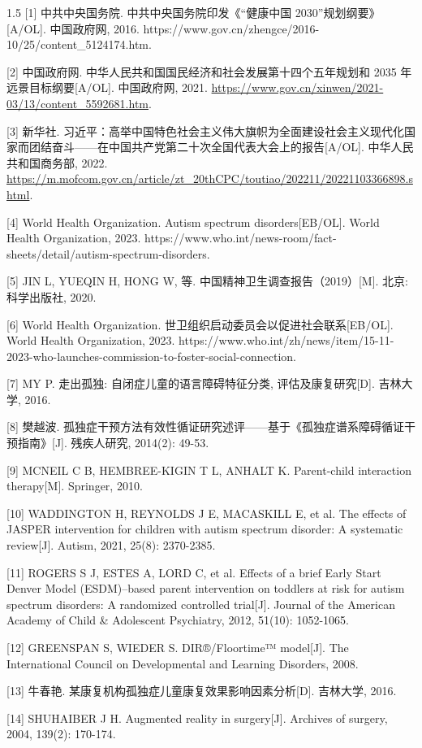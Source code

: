 \documentclass[zihao=-4]{ctexart}
\begin{document}
\begin{spacing}{1.5}
[1] 中共中央国务院. 中共中央国务院印发《“健康中国 2030”规划纲要》[A/OL]. 中国政府网, 2016. https://www.gov.cn/zhengce/2016-10/25/content\_5124174.htm.

[2] 中国政府网. 中华人民共和国国民经济和社会发展第十四个五年规划和 2035 年远景目标纲要[A/OL]. 中国政府网, 2021. \url{https://www.gov.cn/xinwen/2021-03/13/content_5592681.htm}.

[3] 新华社. 习近平：高举中国特色社会主义伟大旗帜为全面建设社会主义现代化国家而团结奋斗——在中国共产党第二十次全国代表大会上的报告[A/OL]. 中华人民共和国商务部, 2022. \url{https://m.mofcom.gov.cn/article/zt_20thCPC/toutiao/202211/20221103366898.shtml}.

[4] World Health Organization. Autism spectrum disorders[EB/OL]. World Health Organization, 2023. https://www.who.int/news-room/fact-sheets/detail/autism-spectrum-disorders.

[5] JIN L, YUEQIN H, HONG W, 等. 中国精神卫生调查报告（2019）[M]. 北京: 科学出版社, 2020.

[6] World Health Organization. 世卫组织启动委员会以促进社会联系[EB/OL]. World Health Organization, 2023. https://www.who.int/zh/news/item/15-11-2023-who-launches-commission-to-foster-social-connection.

[7] MY P. 走出孤独: 自闭症儿童的语言障碍特征分类, 评估及康复研究[D]. 吉林大学, 2016.

[8] 樊越波. 孤独症干预方法有效性循证研究述评——基于《孤独症谱系障碍循证干预指南》[J]. 残疾人研究, 2014(2): 49-53.

[9] MCNEIL C B, HEMBREE-KIGIN T L, ANHALT K. Parent-child interaction therapy[M]. Springer, 2010.

[10] WADDINGTON H, REYNOLDS J E, MACASKILL E, et al. The effects of JASPER intervention for children with autism spectrum disorder: A systematic review[J]. Autism, 2021, 25(8): 2370-2385.

[11] ROGERS S J, ESTES A, LORD C, et al. Effects of a brief Early Start Denver Model (ESDM)--based parent intervention on toddlers at risk for autism spectrum disorders: A randomized controlled trial[J]. Journal of the American Academy of Child \& Adolescent Psychiatry, 2012, 51(10): 1052-1065.

[12] GREENSPAN S, WIEDER S. DIR®/Floortime™ model[J]. The International Council on Developmental and Learning Disorders, 2008.

[13] 牛春艳. 某康复机构孤独症儿童康复效果影响因素分析[D]. 吉林大学, 2016.

[14] SHUHAIBER J H. Augmented reality in surgery[J]. Archives of surgery, 2004, 139(2): 170-174.


\end{spacing}
\end{document}
